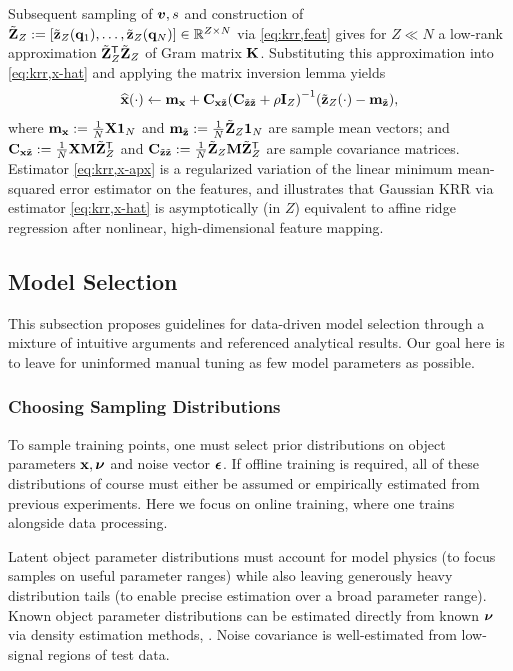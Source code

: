 Subsequent sampling of $\boldsymbol{v},s$ 
and construction of 
$\bmZt := \brac{\bmztZa{\bmq_1},\dots,\bmztZa{\bmq_N}} \in \reals{Z \times N}$
via \eqref{eq:krr,feat}
gives for $Z \ll N$
a low-rank approximation $\tilde{\mathbf{Z}}_Z^{\mathsf{T}}\tilde{\mathbf{Z}}_Z$ 
of Gram matrix $\mathbf{K}$.
Substituting this approximation into \eqref{eq:krr,x-hat}
and applying the matrix inversion lemma \cite{woodbury:50:imm} 
yields
\begin{align}
	\esta{\bmx}{\cdot} \gets \bmmx + \Cxzt\inv{\Cztzt + \rho\eye{Z}} \paren{\bmztZa{\cdot} - \bmmzt},
	\label{eq:krr,x-apx}
\end{align}
where $\mathbf{m}_{\mathbf{x}} := \frac{1}{N}\mathbf{X}\boldsymbol{1}_{N}$ 
and $\mathbf{m}_{\tilde{\mathbf{z}}} := \frac{1}{N}\tilde{\mathbf{Z}}_Z\boldsymbol{1}_{N}$ 
are sample mean vectors; and
$\mathbf{C}_{\mathbf{x}\tilde{\mathbf{z}}} := \frac{1}{N}\mathbf{X}\mathbf{M}\tilde{\mathbf{Z}}_Z^{\mathsf{T}}$
and $\mathbf{C}_{\tilde{\mathbf{z}}\tilde{\mathbf{z}}} := \frac{1}{N}\tilde{\mathbf{Z}}_Z\mathbf{M}\tilde{\mathbf{Z}}_Z^{\mathsf{T}}$ 
are sample covariance matrices.
Estimator \eqref{eq:krr,x-apx} 
is a regularized variation
of the linear minimum mean-squared error estimator
on the features,
and illustrates
that Gaussian KRR via estimator \eqref{eq:krr,x-hat}
is asymptotically (in $Z$) equivalent
to affine ridge regression
after nonlinear, high-dimensional feature mapping.

\subsection{Model Selection}
\label{ss,krr,pract,mod}

This subsection proposes guidelines
for data-driven model selection
through a mixture
of intuitive arguments
and referenced analytical results.
Our goal here is to leave
for uninformed manual tuning
as few model parameters as possible.

\subsubsection{Choosing Sampling Distributions}
\label{sss,krr,pract,mod,dist}

To sample training points,
one must select prior distributions
on object parameters $\mathbf{x},\boldsymbol{\nu}$
and noise vector $\boldsymbol{\epsilon}$. 
If offline training is required,
all of these distributions of course
must either be assumed
or empirically estimated
from previous experiments.
Here we focus on online training,
where one trains alongside data processing.

Latent object parameter distributions 
must account for model physics
(to focus samples on useful parameter ranges)
while also leaving generously heavy distribution tails
(to enable precise estimation 
over a broad parameter range).
Known object parameter distributions
can be estimated directly from known $\boldsymbol{\nu}$
via density estimation methods, 
\eg \cite{parzen:62:oeo}.
Noise covariance is well-estimated
from low-signal regions of test data.

